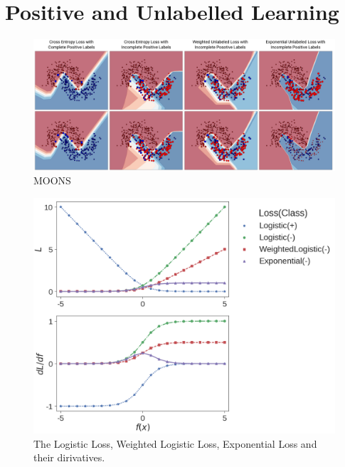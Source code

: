 \section{Positive and Unlabelled Learning}
\label{pulearning}


\begin{figure}
\begin{center}
   \includegraphics[width=0.95\linewidth]{img/moons.png}
\end{center}
   \caption{MOONS}
\label{fig:moons}
\end{figure}


\begin{figure}[t]
\begin{center}
   \includegraphics[width=0.95\linewidth]{img/losses.png}
\end{center}
   \caption{The Logistic Loss, Weighted Logistic Loss, Exponential Loss and their dirivatives.}
\label{fig:losses}
\end{figure}


